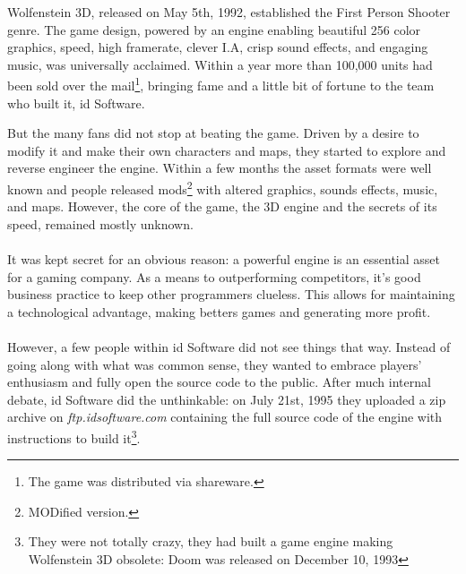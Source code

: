 Wolfenstein 3D, released on May 5th, 1992, established the First Person Shooter genre. The game design, powered by an engine enabling beautiful 256 color graphics, speed, high framerate, clever I.A, crisp sound effects, and engaging music, was universally acclaimed. Within a year more than 100,000 units had been sold over the mail\footnote{The game was distributed via shareware.}, bringing fame and a little bit of fortune to the team who built it, id Software.\\
\par
\begin{figure}[H]
\centering
{}
\end{figure}
\par
But the many fans did not stop at beating the game. Driven by a desire to modify it and make their own characters and maps, they started to explore and reverse engineer the engine. Within a few months the asset formats were well known and people released mods\footnote{MODified version.} with altered graphics, sounds effects, music, and maps. However, the core of the game, the 3D engine and the secrets of its speed, remained mostly unknown.\\
\\
It was kept secret for an obvious reason: a powerful engine is an essential asset for a gaming company. As a means to outperforming competitors, it's good business practice to keep other programmers clueless. This allows for maintaining a technological advantage, making betters games and generating more profit.\\
\\
However, a few people within id Software did not see things that way. Instead of going along with what was common sense, they wanted to embrace players' enthusiasm and fully open the source code to the public. After much internal debate, id Software did the unthinkable: on July 21st, 1995 they uploaded a zip archive on \emph{ftp.idsoftware.com} containing the full source code of the engine with instructions to build it\footnote{They were not totally crazy, they had built a game engine making Wolfenstein 3D obsolete: Doom was released on December 10, 1993}.\\

